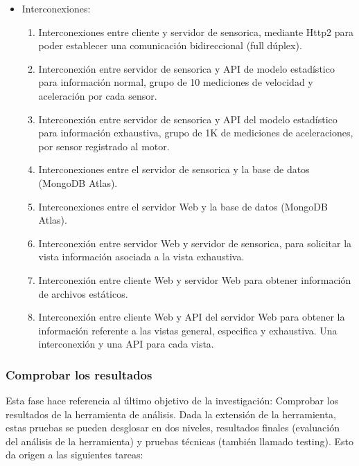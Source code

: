 \begin{itemize}
    \item Interconexiones:
        \begin{enumerate}
            \item Interconexiones entre cliente y servidor de sensorica, mediante
                Http2 para poder establecer una comunicación bidireccional (full dúplex).
            \item Interconexión entre servidor de sensorica y API de modelo
                estadístico para información normal, grupo de 10
                mediciones de velocidad y aceleración por cada sensor.
            \item Interconexión entre servidor de sensorica y API del modelo
                estadístico para información exhaustiva, grupo de 1K de mediciones
                de aceleraciones, por sensor registrado al motor.
            \item Interconexiones entre el servidor de sensorica y la base de datos
                (MongoDB Atlas).
            \item Interconexiones entre el servidor Web y la base de datos (MongoDB Atlas).
            \item Interconexión entre servidor Web y servidor de sensorica, para
                solicitar la vista información asociada a la vista exhaustiva.
            \item Interconexión entre cliente Web y servidor Web para obtener
                información de archivos estáticos.
            \item Interconexión entre cliente Web y API del servidor Web para
                obtener la información referente a las vistas general, especifica
                y exhaustiva. Una interconexión y una API para cada vista.
        \end{enumerate}
\end{itemize}


\subsubsection{Comprobar los resultados}
Esta fase hace referencia al último objetivo de la investigación: Comprobar los
resultados de la herramienta de análisis. Dada la extensión de la herramienta,
estas pruebas se pueden desglosar en dos niveles, resultados finales (evaluación
del análisis de la herramienta) y pruebas técnicas (también llamado testing).
Esto da origen a las siguientes tareas:

